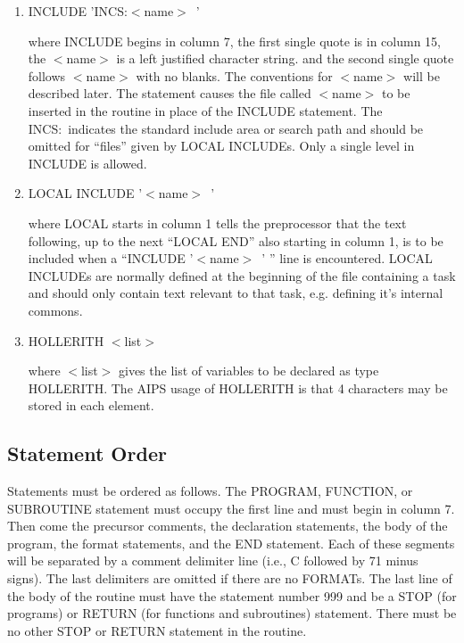 \begin{enumerate} %
\item INCLUDE 'INCS:$<$name$>$\ '

where INCLUDE begins in column 7, the first single quote is in column
15, the $<$name$>$ is a left justified character string.
and the second single quote follows $<$name$>$ with no
blanks.  The conventions for $<$name$>$ will be described later.  The
statement causes the file called $<$name$>$ to be inserted in the routine
in place of the INCLUDE statement. The INCS:~indicates the standard
include area or search path and should be omitted for ``files'' given
by LOCAL INCLUDEs.  Only a single level in INCLUDE is allowed.

\item LOCAL INCLUDE '$<$name$>$\ '

where LOCAL starts in column 1 tells the preprocessor that the text
following, up to the next ``LOCAL END'' also starting in column 1, is
to be included when a ``INCLUDE '$<$name$>$\ ' '' line is encountered.
LOCAL INCLUDEs are normally defined at the beginning of the file
containing a task and should only contain text relevant to that task,
e.g. defining it's internal commons.

\item HOLLERITH $<$list$>$

where $<$list$>$ gives the list of variables to be declared as type
HOLLERITH.  The AIPS usage of HOLLERITH is that 4 characters
may be stored in each element.

\end{enumerate} %

\subsection{Statement Order}
Statements must be ordered as follows.  The PROGRAM, FUNCTION, or
SUBROUTINE statement must occupy the first line and must begin in
column 7.  Then come the precursor comments, the declaration
statements, the body of the program, the format statements, and the
END statement.  Each of these segments will be separated by a comment
delimiter line (i.e., C followed by 71 minus signs).
The last delimiters are omitted if there are no FORMATs.  The last
line of the body of the routine must have the statement number 999 and
be a STOP (for programs) or RETURN (for functions and subroutines)
statement.  There must be no other STOP or RETURN statement in the
routine.

